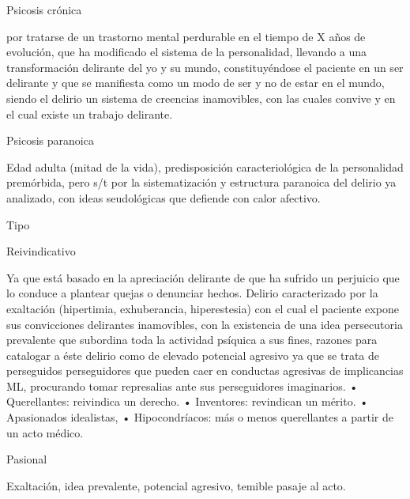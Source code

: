 Psicosis crónica

por tratarse de un trastorno mental perdurable en el tiempo de X años de evolución, que ha modificado el sistema de la personalidad, llevando a una transformación delirante del yo y su mundo, constituyéndose el paciente en un ser delirante y que se manifiesta como un modo de ser y no de estar en el mundo, siendo el delirio un sistema de creencias inamovibles, con las cuales convive y en el cual existe un trabajo delirante.

Psicosis paranoica

Edad adulta (mitad de la vida), predisposición caracteriológica de la personalidad premórbida, pero s/t por la sistematización y estructura paranoica del delirio ya analizado, con ideas seudológicas que defiende con calor afectivo.

Tipo

Reivindicativo

Ya que está basado en la apreciación delirante de que ha sufrido un perjuicio que lo conduce a plantear quejas o denunciar hechos. Delirio caracterizado por la exaltación (hipertimia, exhuberancia, hiperestesia) con el cual el paciente expone sus convicciones delirantes inamovibles, con la existencia de una idea persecutoria prevalente que subordina toda la actividad psíquica a sus fines, razones para catalogar a éste delirio como de elevado potencial agresivo ya que se trata de perseguidos perseguidores que pueden caer en conductas agresivas de implicancias ML, procurando tomar represalias ante sus perseguidores imaginarios. • Querellantes: reivindica un derecho. • Inventores: revindican un mérito. • Apasionados idealistas, • Hipocondríacos: más o menos querellantes a partir de un acto médico.

Pasional

Exaltación, idea prevalente, potencial agresivo, temible pasaje al acto.

